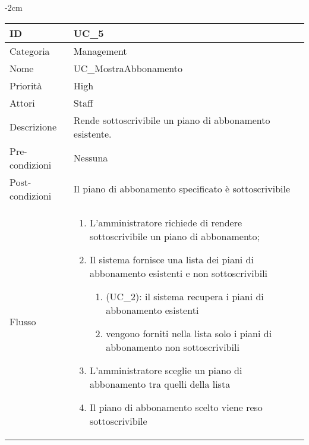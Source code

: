\begin{center}
\begin{table}[bp]
    \centering
    \addtolength{\leftskip} {-2cm}
\begin{tabular}{ |p{2.6cm}|p{13cm}|  }
\hline
ID & UC\_5 \\\hline
Categoria & Management\\\hline
Nome & UC\_MostraAbbonamento\\\hline
Priorità & High \\\hline
Attori &  Staff \\\hline
Descrizione & Rende sottoscrivibile un piano di abbonamento esistente.\\\hline
Pre-condizioni &  Nessuna \\\hline
Post-condizioni &  Il piano di abbonamento specificato è sottoscrivibile\\\hline
Flusso &  	\vspace{-5mm} \begin{enumerate}
		\item L'amministratore richiede di rendere sottoscrivibile un piano di abbonamento;
		\item Il sistema fornisce una lista dei piani di abbonamento esistenti e non sottoscrivibili
			\begin{enumerate}[  ]
			\item (UC\_2): il sistema recupera i piani di abbonamento esistenti
			\item vengono forniti nella lista solo i piani di abbonamento non sottoscrivibili
			\end{enumerate}
		\item L'amministratore sceglie un piano di abbonamento tra quelli della lista
		\item Il piano di abbonamento scelto viene reso sottoscrivibile
		\end{enumerate}\\\hline
\end{tabular}
\label{table_use_case:5}\newline
\end{table}



\end{center}
